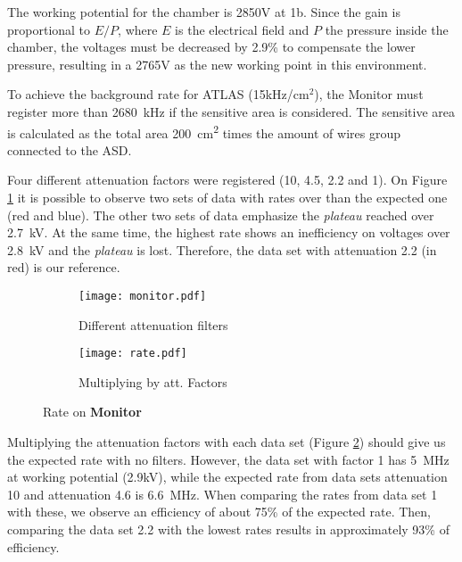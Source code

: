 The working potential for the chamber is 2850V at \unit{1}{b}. Since the gain is proportional to $E/P$, where $E$ is
the electrical field and $P$ the pressure inside the chamber, the voltages must be decreased by 2.9\% to compensate
the lower pressure, resulting in a 2765V as the new working point in this environment.\par 


To achieve the background rate for ATLAS (\unit{15}{kHz/cm$^2$}), the Monitor must register more than \SI{2680}{kHz} if
the sensitive area is considered. The sensitive area is calculated as the total area \SI{200}{cm^2} times the amount of
wires group connected to the ASD.\par

Four different attenuation factors were registered (10, 4.5, 2.2 and 1). On Figure \ref{fig:monrate} it is possible to
observe two sets of data with rates over than the expected one (red and blue). The other two sets of data emphasize the
{\it plateau} reached over \SI{2.7}{kV}. At the same time, the highest rate shows an inefficiency on voltages over
\SI{2.8}{kV} and the {\it plateau} is lost. Therefore, the data set with attenuation 2.2 (in red) is our reference.\par
\begin{figure}[H]
	\hspace*{\fill}
	\begin{subfigure}[b]{0.45\textwidth}
		\centering
		\texttt{[image: monitor.pdf]}
		\caption{Different attenuation filters}\label{fig:monrate}
	\end{subfigure}
	\hfill
	\begin{subfigure}[b]{0.45\textwidth}
		\centering
		\texttt{[image: rate.pdf]}
		\caption{Multiplying by att. Factors}\label{fig:filters}
	\end{subfigure}
	\hspace*{\fill}
	\caption{Rate on {\bf Monitor}}\label{}
\end{figure}

Multiplying the attenuation factors with each data set (Figure \ref{fig:filters}) should give us the expected rate with
no filters. However, the data set with factor 1 has \SI{5}{MHz} at working potential (2.9kV), while the expected rate
from data sets attenuation 10 and attenuation 4.6 is \SI{6.6}{MHz}. When comparing the rates from data set 1 with these,
we observe an efficiency of about 75\% of the  expected rate. Then, comparing the data set 2.2 with the lowest rates
results in approximately 93\% of efficiency.\par

